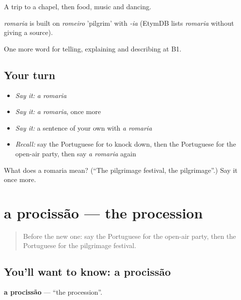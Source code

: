 A trip to a chapel, then food, music and dancing.

\begin{cousinweb}
\emph{romaria} is built on \emph{romeiro} 'pilgrim' with \emph{-ia} (EtymDB lists \emph{romaria} without giving a source).
\end{cousinweb}

\begin{grammarlens}[title={What you've built}]
One more word for telling, explaining and describing at B1.
\end{grammarlens}

\subsection*{Your turn}
\begin{itemize}
\raggedright
  \item \emph{Say it:} \emph{a romaria}
  \item \emph{Say it:} \emph{a romaria}, once more
  \item \emph{Say it:} a sentence of your own with \emph{a romaria}
  \item \emph{Recall:} say the Portuguese for to knock down, then the Portuguese for the open-air party, then say \emph{a romaria} again
\end{itemize}

\begin{tcolorbox}[breakable,colback=teal!4,colframe=teal!35!black,title={Before you move on}]
What does a romaria mean? (\textquotedblleft{}The pilgrimage festival, the pilgrimage\textquotedblright{}.) Say it once more.
\end{tcolorbox}
\section[a procissão]{a procissão — the procession}

\label{lesson:PT-C446-procissao}



\begin{quote}
Before the new one: say the Portuguese for the open-air party, then the Portuguese for the pilgrimage festival.
\end{quote}

\subsection*{You'll want to know: a procissão}
\textbf{a procissão} — \textquotedblleft{}the procession\textquotedblright{}.

